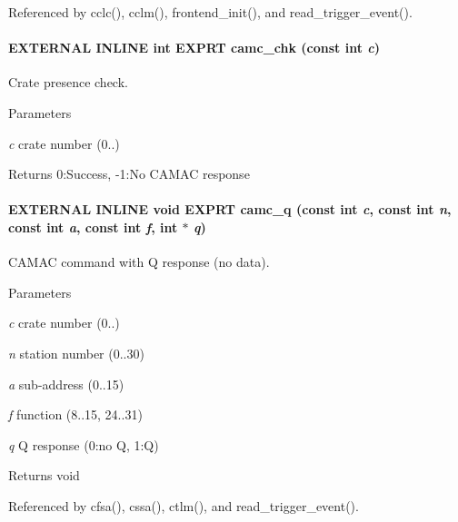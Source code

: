 Referenced by cclc(), cclm(), frontend\_\-init(), and read\_\-trigger\_\-event().
\paragraph[{camc\_\-chk}]{\setlength{\rightskip}{0pt plus 5cm}EXTERNAL INLINE int EXPRT camc\_\-chk (const int {\em c})}\hfill\label{group__mcstdfunctionh_gabffc7c8094fc71d3e2bcd6be9cd0c9a3}
Crate presence check. 
\begin{DoxyParams}{Parameters}
\item[{\em c}]crate number (0..) \end{DoxyParams}
\begin{DoxyReturn}{Returns}
0:Success, -\/1:No CAMAC response 
\end{DoxyReturn}
\paragraph[{camc\_\-q}]{\setlength{\rightskip}{0pt plus 5cm}EXTERNAL INLINE void EXPRT camc\_\-q (const int {\em c}, \/  const int {\em n}, \/  const int {\em a}, \/  const int {\em f}, \/  int $\ast$ {\em q})}\hfill\label{group__mcstdfunctionh_gac33eb92d1f484fe1e76fdc001eefe48b}
CAMAC command with Q response (no data). 
\begin{DoxyParams}{Parameters}
\item[{\em c}]crate number (0..) \item[{\em n}]station number (0..30) \item[{\em a}]sub-\/address (0..15) \item[{\em f}]function (8..15, 24..31) \item[{\em q}]Q response (0:no Q, 1:Q) \end{DoxyParams}
\begin{DoxyReturn}{Returns}
void 
\end{DoxyReturn}


Referenced by cfsa(), cssa(), ctlm(), and read\_\-trigger\_\-event().
